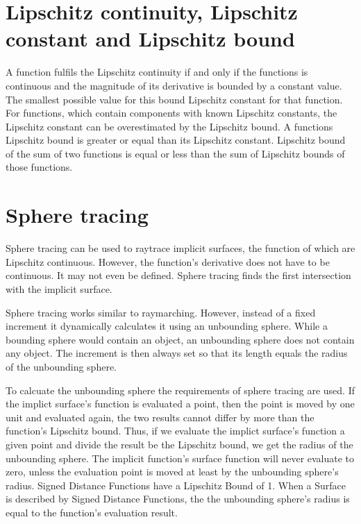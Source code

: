 \section{Lipschitz continuity, Lipschitz constant and Lipschitz bound}
A function fulfils the Lipschitz continuity if and only if the functions is continuous and the magnitude of its derivative is bounded by a constant value. The smallest possible value for this bound Lipschitz constant for that function. For functions, which contain components with known Lipschitz constants, the Lipschitz constant can be overestimated by the Lipschitz bound. A functions Lipschitz bound is greater or equal than its Lipschitz constant. Lipschitz bound of the sum of two functions is equal or less than the sum of Lipschitz bounds of those functions. 
\cite{hart:1996:sphere} \cite{Heuser:2003}

\section{Sphere tracing}
\cite{hart:1996:sphere}

Sphere tracing can be used to raytrace implicit surfaces, the function of which are Lipschitz continuous. However, the function's derivative does not have to be continuous. It may not even be defined. Sphere tracing finds the first intersection with the implicit surface.

Sphere tracing works similar to raymarching. However, instead of a fixed increment it dynamically calculates it using an unbounding sphere. While a bounding sphere would contain an object, an unbounding sphere does not contain any object. The increment is then always set so that its length equals the radius of the unbounding sphere.

To calcuate the unbounding sphere the requirements of sphere tracing are used. If the implict surface's function is evaluated a point, then the point is moved by one unit and evaluated again, the two results cannot differ by more than the function's Lipschitz bound. Thus, if we evaluate the implict surface's function a given point and divide the result be the Lipschitz bound, we get the radius of the unbounding sphere. The implicit function's surface function will never evaluate to zero, unless the evaluation point is moved at least by the unbounding sphere's radius. Signed Distance Functions have a Lipschitz Bound of 1. When a Surface is described by Signed Distance Functions, the the unbounding sphere's radius is equal to the function's evaluation result.












